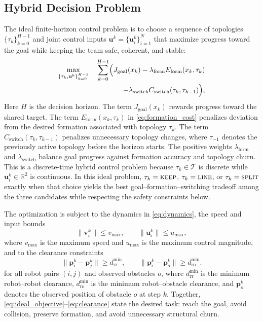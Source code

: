 \documentclass{ieeeaccess}
\newcommand{\R}{\mathbb{R}}
\newcommand{\cT}{\mathcal{T}}
\newcommand{\bfu}{\mathbf{u}}
\newcommand{\bfp}{\mathbf{p}}
\newcommand{\bfv}{\mathbf{v}}
\begin{document}
\subsection{Hybrid Decision Problem}
The ideal finite-horizon control problem is to choose a sequence of
topologies $\{\tau_k\}_{k=0}^{H-1}$ and joint control inputs
$\bfu^k=\{\bfu_i^k\}_{i=1}^N$ that maximize progress
toward the goal while keeping the team safe, coherent, and stable:
\begin{equation}
\begin{aligned}
\max_{\{\tau_k,\bfu^k\}_{k=0}^{H-1}} \quad
\sum_{k=0}^{H-1} \Bigl(
J_{\mathrm{goal}}(x_k)
- \lambda_{\mathrm{form}} E_{\mathrm{form}}(x_k,\tau_k) \\
\qquad\qquad\qquad
- \lambda_{\mathrm{switch}} C_{\mathrm{switch}}(\tau_k,\tau_{k-1})
\Bigr),
\end{aligned}
\label{eq:ideal_objective}
\end{equation}
Here $H$ is the decision horizon. The term $J_{\mathrm{goal}}(x_k)$
rewards progress toward the shared target. The term
$E_{\mathrm{form}}(x_k,\tau_k)$ in \eqref{eq:formation_cost}
penalizes deviation from the desired formation associated with
topology $\tau_k$. The term
$C_{\mathrm{switch}}(\tau_k,\tau_{k-1})$ penalizes unnecessary
topology changes, where $\tau_{-1}$ denotes the previously active
topology before the horizon starts. The positive weights
$\lambda_{\mathrm{form}}$ and $\lambda_{\mathrm{switch}}$ balance goal
progress against formation accuracy and topology churn. This is a
discrete-time hybrid control problem because
$\tau_k\in\cT$ is discrete while $\bfu_i^k\in\R^2$ is continuous.
In this ideal problem, $\tau_k=\textsc{keep}$, $\tau_k=\textsc{line}$,
or $\tau_k=\textsc{split}$ exactly when that choice yields the best
goal--formation--switching tradeoff among the three candidates while
respecting the safety constraints below.

The optimization is subject to the dynamics in \eqref{eq:dynamics}, the
speed and input bounds
\begin{equation}
\|\bfv_i^k\| \le v_{\max},
\qquad
\|\bfu_i^k\| \le u_{\max},
\label{eq:bounds}
\end{equation}
where $v_{\max}$ is the maximum speed and $u_{\max}$ is the maximum
control magnitude, and to the clearance constraints
\begin{equation}
\|\bfp_i^k-\bfp_j^k\| \ge d_{\mathrm{rr}}^{\min},
\qquad
\|\bfp_i^k-\bfp_o^k\| \ge d_{\mathrm{ro}}^{\min}.
\label{eq:clearance}
\end{equation}
for all robot pairs $(i,j)$ and observed obstacles $o$, where
$d_{\mathrm{rr}}^{\min}$ is the minimum robot--robot clearance,
$d_{\mathrm{ro}}^{\min}$ is the minimum robot--obstacle clearance, and
$\bfp_o^k$ denotes the observed position of obstacle $o$ at step $k$.
Together, \eqref{eq:ideal_objective}--\eqref{eq:clearance} state the
desired task: reach the goal, avoid collision, preserve formation, and
avoid unnecessary structural churn.
\end{document}
